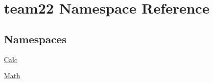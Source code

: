 \hypertarget{namespaceteam22}{}\section{team22 Namespace Reference}
\label{namespaceteam22}
\subsection*{Namespaces}
\begin{DoxyCompactItemize}
\item 
 \hyperlink{namespaceteam22_1_1_calc}{Calc}
\item 
 \hyperlink{namespaceteam22_1_1_math}{Math}
\end{DoxyCompactItemize}
